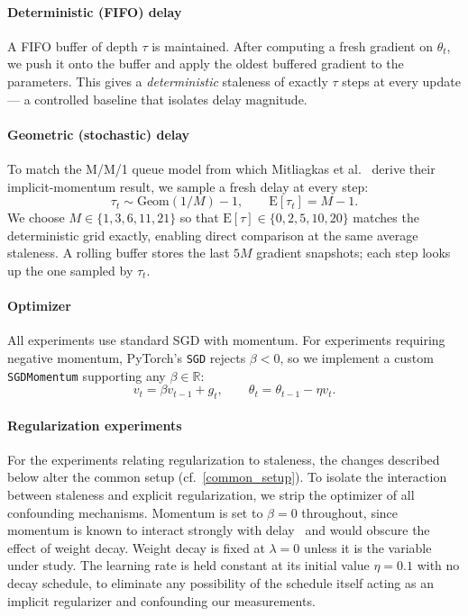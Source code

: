 \documentclass[10pt,conference,compsocconf]{IEEEtran}
\begin{document}
\paragraph{Deterministic (FIFO) delay}
A FIFO buffer of depth $\tau$ is maintained.
After computing a fresh gradient on $\theta_t$, we push it onto the buffer
and apply the oldest buffered gradient to the parameters.
This gives a \emph{deterministic} staleness of exactly $\tau$ steps at
every update --- a controlled baseline that isolates delay magnitude.

\paragraph{Geometric (stochastic) delay}
To match the M/M/1 queue model from which Mitliagkas et
al.~\cite{mitliagkas2014async} derive their implicit-momentum result,
we sample a fresh delay at every step:
\begin{equation}
  \tau_t \sim \mathrm{Geom}(1/M) - 1, \qquad \mathrm{E}[\tau_t] = M-1.
\end{equation}
We choose $M \in \{1, 3, 6, 11, 21\}$ so that $\mathrm{E}[\tau] \in
\{0, 2, 5, 10, 20\}$ matches the deterministic grid exactly, enabling
direct comparison at the same average staleness.
A rolling buffer stores the last $5M$ gradient snapshots; each step
looks up the one sampled by $\tau_t$.

\paragraph{Optimizer}
All experiments use standard SGD with momentum.
For experiments requiring negative momentum, PyTorch's \texttt{SGD} rejects
$\beta < 0$, so we implement a custom \texttt{SGDMomentum} supporting any
$\beta \in \mathbb{R}$:
\begin{equation}
  v_t = \beta v_{t-1} + g_t,\qquad \theta_t = \theta_{t-1} - \eta v_t.
\end{equation}

\paragraph{Regularization experiments} 
For the experiments relating regularization to staleness, the changes described below alter the common setup (cf.~\ref{common_setup}). 
To isolate the interaction between staleness and explicit regularization,
we strip the optimizer of all confounding mechanisms. Momentum is set to
$\beta=0$ throughout, since momentum is known to interact strongly with
delay~\cite{mitliagkas2014async} and would obscure the effect of weight
decay. Weight decay is fixed at $\lambda=0$ unless it is the variable
under study. The learning rate is held constant at its initial value
$\eta=0.1$ with no decay schedule, to eliminate any possibility of the
schedule itself acting as an implicit regularizer and confounding our
measurements.
\end{document}

